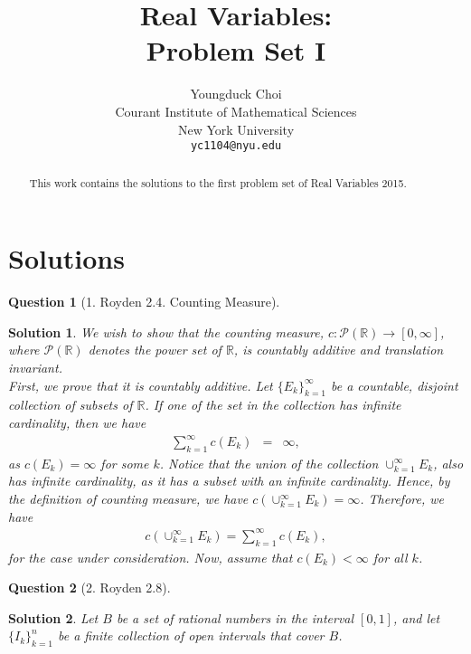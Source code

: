 \documentclass{article} %
\title{Real Variables: \\
Problem Set I}
\author{
Youngduck Choi \\
Courant Institute of Mathematical Sciences \\
New York University \\
\texttt{yc1104@nyu.edu} \\
}
\theoremstyle{quest}
\newtheorem*{question}{Question}
\newtheorem*{solution}{Solution}
\begin{document}
\maketitle

\begin{abstract}
This work contains the solutions to the first problem set of Real Variables 2015.
\end{abstract}

\section{Solutions}
\begin{question}[1. Royden 2.4. Counting Measure]
\end{question}
\begin{solution}
We wish to show that the counting measure, $c: \mathcal{P}(\mathbb{R}) 
\to [0,\infty]$, where $\mathcal{P}(\mathbb{R})$ denotes the power set of $\mathbb{R}$, is
countably additive and translation invariant. \\ 

First, we prove that it is countably additive. Let $\{ E_k \}_{k=1}^{\infty}$ be a countable,
disjoint collection of subsets of $\mathbb{R}$. 
If one of the set in the collection has infinite cardinality, then 
we have  
\begin{eqnarray*}
\sum_{k=1}^{\infty} c(E_k) &=& \infty,
\end{eqnarray*}
as $c(E_k) = \infty$ for some $k$. Notice that the union of the collection $\cup_{k=1}^{\infty} E_k$,
also has infinite cardinality, as it has a subset with an infinite cardinality. Hence, by the definition
of counting measure, we have
$c(\cup_{k=1}^{\infty}E_k) = \infty$. Therefore, we have
\begin{eqnarray*}
c(\cup_{k=1}^{\infty}E_k) = \sum_{k=1}^{\infty} c(E_k),
\end{eqnarray*}
for the case under consideration. Now, assume that $c(E_k) < \infty$ for all $k$.


\end{solution}

\bigskip

\begin{question}[2. Royden 2.8]
\end{question}
\begin{solution}
Let $B$ be a set of rational numbers in the interval $[0,1]$, and let $\{ I_k \}_{k=1}^{n}$ be a 
finite collection of open intervals that cover $B$.
\end{solution}
\end{document}
